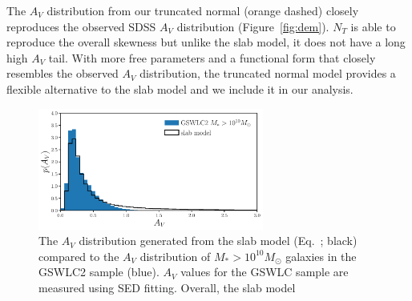 The $A_V$ distribution from our truncated normal (orange dashed) closely
reproduces the observed SDSS $A_V$ distribution (Figure~\ref{fig:dem}). $N_T$
is able to reproduce the overall skewness but unlike the slab model, it does
not have a long high $A_V$ tail. With more free parameters and a functional
form that closely resembles the observed $A_V$ distribution, the truncated
normal model provides a flexible alternative to the slab model and we include
it in our analysis.  

\begin{figure}
    \begin{center}
        \includegraphics[width=0.66\textwidth]{figs/slab_model.pdf} 
        \caption{\label{fig:av_dist}
        The $A_V$ distribution generated from the slab model (Eq.~;
        black) compared to the $A_V$ distribution of $M_* > 10^{10}M_\odot$
        galaxies in the \cite{salim2018} GSWLC2 sample (blue). 
        $A_V$ values for the GSWLC sample are measured using SED fitting. 
        Overall, the slab model 
        }
    \end{center}
\end{figure}






